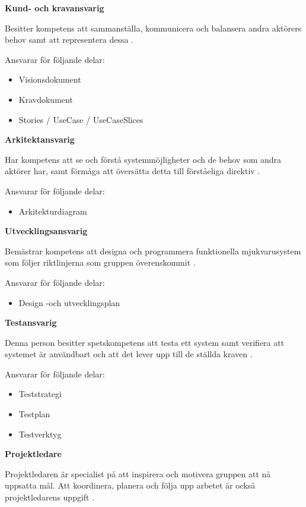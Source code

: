 \documentclass[conference]{IEEEtran}
\begin{document}
\textbf{Kund- och kravansvarig}

Besitter kompetens att sammanställa, kommunicera och balansera andra aktörers behov samt att representera dessa \cite{object_management_group_kernel_2014}.

Ansvarar för följande delar: 
\begin{itemize}
    \item Visionsdokument
    \item Kravdokument
    \item Stories / UseCase / UseCaseSlices
\end{itemize}


\textbf{Arkitektansvarig} 

Har kompetens att se och förstå systemmöjligheter och de behov som andra aktörer har, samt förmåga att översätta detta till förståeliga direktiv \cite{object_management_group_kernel_2014}.

Ansvarar för följande delar:
\begin{itemize}
    \item Arkitekturdiagram
\end{itemize}


\textbf{Utvecklingsansvarig}

Bemästrar kompetens att designa och programmera funktionella mjukvarusystem som följer riktlinjerna som gruppen överenskommit \cite{object_management_group_kernel_2014}.

Ansvarar för följande delar:
\begin{itemize}
    \item Design -och utvecklingsplan 
\end{itemize}


\textbf{Testansvarig}

Denna person besitter spetskompetens att testa ett system samt verifiera att systemet är användbart och att det lever upp till de ställda kraven \cite{object_management_group_kernel_2014}.

Ansvarar för följande delar:  
\begin{itemize}
    \item Teststrategi
    \item Testplan
    \item Testverktyg
\end{itemize}


\textbf{Projektledare}

Projektledaren är specialist på att inspirera och motivera gruppen att nå uppsatta mål. Att koordinera, planera och följa upp arbetet är också projektledarens uppgift \cite{object_management_group_kernel_2014}.
\end{document}
